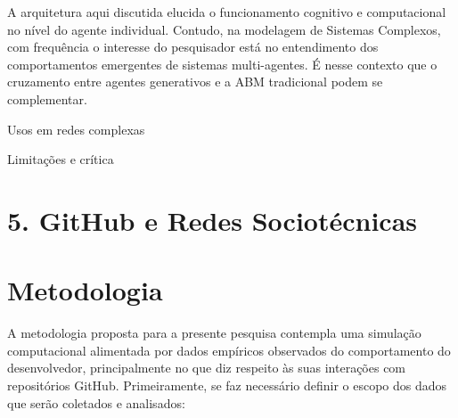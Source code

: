 \documentclass[12pt,oneside,a4paper,brazil,sumario=tradicional]{abntex2}
\begin{document}
A arquitetura aqui discutida elucida o funcionamento cognitivo e computacional no nível do agente individual. Contudo, na modelagem de Sistemas Complexos, com frequência o interesse do pesquisador está no entendimento dos comportamentos emergentes de sistemas multi-agentes. É nesse contexto que o cruzamento entre agentes generativos e a ABM tradicional podem se complementar.


Usos em redes complexas

Limitações e crítica

\section*{5. GitHub e Redes Sociotécnicas}

\section*{Metodologia}
A metodologia proposta para a presente pesquisa contempla uma simulação computacional alimentada por dados empíricos observados do comportamento do desenvolvedor, principalmente no que diz respeito às suas interações com repositórios GitHub.  Primeiramente, se faz necessário definir o escopo dos dados que serão coletados e analisados:
\end{document}
